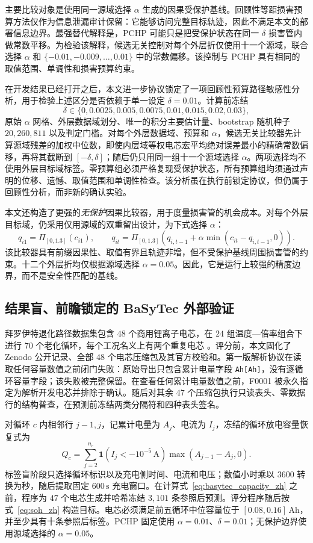 \documentclass[UTF8,11pt]{ctexart}
\begin{document}
主要比较对象是使用同一源域选择 $\alpha$ 生成的因果受保护基线。回顾性等距损害预算方法仅作为信息泄漏审计保留：它能够访问完整目标轨迹，因此不满足本文的部署信息边界。最强替代解释是，PCHP 可能只是把受保护状态在同一 $\delta$ 损害管内做常数平移。为检验该解释，候选无关控制对每个外层折仅使用十一个源域，联合选择 $\alpha$ 和 $\{-0.01,-0.009,\ldots,0.01\}$ 中的常数偏移。该控制与 PCHP 具有相同的取值范围、单调性和损害预算约束。

在开发结果已经打开之后，本文进一步协议锁定了一项回顾性预算路径敏感性分析，用于检验上述区分是否依赖于单一设定 $\delta=0.01$。计算前冻结
\[
\delta\in\{0,0.0025,0.005,0.0075,0.01,0.015,0.02,0.03\},
\]
原始 $\alpha$ 网格、外层数据域划分、唯一的积分主要估计量、bootstrap 随机种子 $20{,}260{,}811$ 以及判定门槛。对每个外层数据域、预算和 $\alpha$，候选无关比较器先计算源域残差的加权中位数，即使内层域等权电芯宏平均绝对误差最小的精确常数偏移，再将其截断到 $[-\delta,\delta]$；随后仍只用同一组十一个源域选择 $\alpha$。两项选择均不使用外层目标域标签。零预算组必须严格复现受保护状态，所有预算组均须通过声明的位移、遗憾、取值范围和单调性检查。该分析虽在执行前锁定协议，但仍属于回顾性分析，而非新的确认实验。

本文还构造了更强的\emph{无保护}因果比较器，用于度量损害管的机会成本。对每个外层目标域，仍采用仅用源域的双重留出设计，为下式选择 $\alpha$：
\[
q_{i1}=\Pi_{[0,1.3]}(c_{i1}),\qquad
q_{it}=\Pi_{[0,1.3]}\!\left(q_{i,t-1}+\alpha\min(c_{it}-q_{i,t-1},0)\right).
\]
该比较器具有前缀因果性、取值有界且轨迹非增，但不受保护基线周围损害管的约束。十二个外层折均仅根据源域选择 $\alpha=0.05$。因此，它是运行上较强的精度边界，而不是安全性匹配的基线。

\subsection{结果盲、前瞻锁定的 BaSyTec 外部验证}

拜罗伊特退化路径数据集包含 $48$ 个商用锂离子电芯，在 $24$ 组温度—倍率组合下进行 $70$ 个老化循环，每个工况名义上有两个重复电芯 \citep{ramasubramanian2025degradation,roder2025degradationdata}。评分前，本文固化了 Zenodo 公开记录、全部 $48$ 个电芯压缩包及其官方校验和。第一版解析协议在读取任何容量数值之前闭门失败：原始导出只包含累计电量字段 \texttt{Ah[Ah]}，没有逐循环容量字段；该失败被完整保留。在查看任何累计电量数值之前，F0001 被永久指定为解析开发电芯并排除于确认。随后对其余 $47$ 个压缩包执行只读表头、零数据行的结构普查，在预测前冻结两类分隔符和四种表头签名。

对循环 $c$ 内相邻行 $j-1,j$，记累计电量为 $A_j$、电流为 $I_j$，冻结的循环放电容量恢复式为
\begin{equation}
Q_c=\sum_{j=2}^{n_c}\mathbf{1}\!\left(I_j<-10^{-5}\,\mathrm{A}\right)
\max(A_{j-1}-A_j,0).
\label{eq:basytec_capacity_zh}
\end{equation}
标签盲阶段只选择循环标识以及充电侧时间、电流和电压；数值小时乘以 $3600$ 转换为秒，随后提取固定 $600\,\mathrm{s}$ 充电窗口。在计算式~\eqref{eq:basytec_capacity_zh} 之前，程序为 $47$ 个电芯生成并哈希冻结 $3{,}101$ 条参照后预测。评分程序随后按式~\eqref{eq:soh_zh} 构造目标。电芯必须满足前五循环中位容量位于 $[0.08,0.16]\,\mathrm{Ah}$，并至少具有十条参照后标签。PCHP 固定使用 $\alpha=0.01$、$\delta=0.01$；无保护边界使用源域选择的 $\alpha=0.05$。
\end{document}
